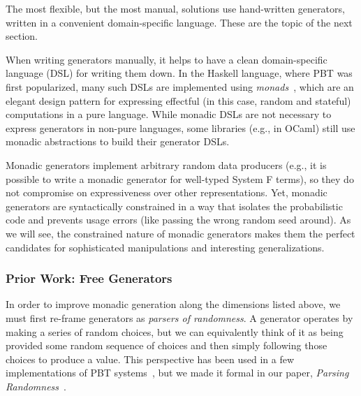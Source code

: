 The most flexible, but the most manual, solutions use hand-written generators,
written in a convenient domain-specific language. These are the topic of the
next section.

When writing generators manually, it helps to have a clean domain-specific
language (DSL) for writing them down. In the Haskell language, where PBT was
first popularized, many such DSLs are implemented using {\em
monads\/}~\cite{moggi1991notions}, which are an elegant design pattern for
expressing effectful (in this case, random and stateful) computations in a pure
language. While monadic DSLs are not necessary to express generators in non-pure
languages, some libraries (e.g., in OCaml) still use monadic abstractions to
build their generator DSLs.

Monadic generators implement arbitrary random data producers (e.g., it is
possible to write a monadic generator for well-typed System F terms), so they do
not compromise on expressiveness over other representations. Yet, monadic
generators are syntactically constrained in a way that isolates the
probabilistic code and prevents usage errors (like passing the wrong random seed
around). As we will see, the constrained nature of monadic generators makes them
the perfect candidates for sophisticated manipulations and interesting
generalizations.

\subsubsection{Prior Work: Free Generators}
In order to improve monadic generation along the dimensions listed above, we
must first re-frame generators as {\em parsers of randomness}. A generator
operates by making a series of random choices, but we can equivalently think of
it as being provided some random sequence of choices and then simply following
those choices to produce a value. This perspective has been used in a few
implementations of PBT systems~\cn{}, but we made it formal in our paper, {\em
Parsing Randomness}~\cite{goldstein2022parsing}.

